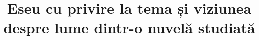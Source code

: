 

\title{Eseu cu privire la tema și viziunea despre lume dintr-o nuvelă studiată}


 \maketitle %
 

